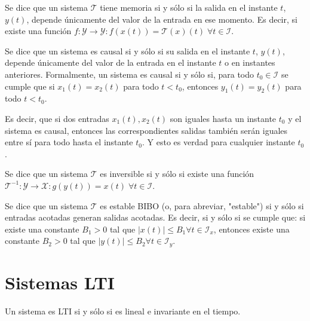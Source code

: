 \begin{definition}[Memoria]
    Se dice que un sistema $\mathcal{T}$ tiene memoria si y sólo si la salida en el instante $t$, $y(t)$, depende únicamente del valor de la entrada en ese momento. Es decir, si existe una función $f: \mathcal{Y} \rightarrow \mathcal{Y} : f(x(t)) = \mathcal{T}(x)(t) \; \forall t \in \mathcal{I}$.
\end{definition}

\begin{definition}[Causalidad]
    Se dice que un sistema es causal si y sólo si su salida en el instante $t$, $y(t)$, depende únicamente del valor de la entrada en el instante $t$ o en instantes anteriores. Formalmente, un sistema es causal si y sólo si, para todo $t_0 \in \mathcal{I}$ se cumple que si $x_1(t) = x_2(t)$ para todo $t < t_0$, entonces $y_1(t) = y_2(t)$ para todo $t < t_0$.
\end{definition}

Es decir, que si dos entradas $x_1(t),x_2(t)$ son iguales hasta un instante $t_0$ y el sistema es causal, entonces las correspondientes salidas también serán iguales entre sí para todo hasta el instante $t_0$. Y esto es verdad para cualquier instante $t_0$.

\begin{definition}[Invertibilidad]
    Se dice que un sistema $\mathcal{T}$ es inversible si y sólo si existe una función $\mathcal{T}^{-1}: \mathcal{Y} \rightarrow \mathcal{X} : g(y(t)) = x(t) \; \forall t \in \mathcal{I}$.
\end{definition}

\begin{definition}
    Se dice que un sistema $\mathcal{T}$ es estable BIBO (o, para abreviar, "estable") si y sólo si entradas acotadas generan salidas acotadas. Es decir, si y sólo si se cumple que: si existe una constante $B_1 > 0$ tal que $|x(t)| \leq B_1 \forall t \in \mathcal{I}_x$, entonces existe una constante $B_2 > 0$ tal que $|y(t)| \leq B_2 \forall t \in \mathcal{I}_y$.
\end{definition}

\section{Sistemas LTI}

\begin{definition}
    Un sistema es LTI si y sólo si es lineal e invariante en el tiempo.
\end{definition}

